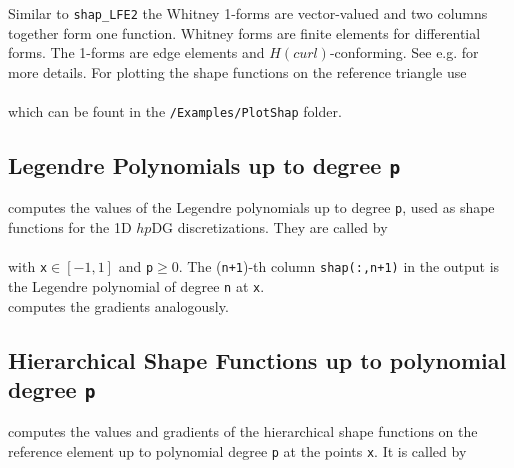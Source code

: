 Similar to {\tt shap\_LFE2} the Whitney 1-forms  are vector-valued and two columns together form one function. Whitney forms are finite elements for differential forms. The 1-forms are edge elements and $H(curl)$-conforming. See e.g. \cite{MO03} for more details. For plotting the shape functions on the reference triangle use \\ 

 \\

which can be fount in the {\tt /Examples/PlotShap} folder.





\subsection{Legendre Polynomials up to degree {\tt p}} \label{ssect:shap_Leg}

  computes the values of the Legendre polynomials up to degree {\tt p}, used as shape functions for the 1D $hp$DG discretizations. They are called by \\

 \\

 with {\tt x}$\in [-1,1]$ and {\tt p}$\geq 0$. %
 The ({\tt n+1})-th column {\tt shap(:,n+1)} in the output is the Legendre polynomial of degree {\tt n} at {\tt x}.\\

 computes the gradients analogously.



\subsection{Hierarchical Shape Functions up to polynomial degree {\tt p}} \label{ssect:shap_hp} 

  computes the values and gradients of the hierarchical shape functions on the reference element up to polynomial degree {\tt p} at the points {\tt x}. It is called by \\

